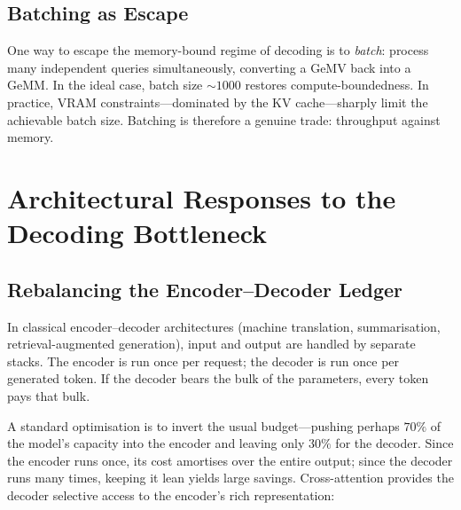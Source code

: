 \documentclass[11pt,a4paper]{article}
\theoremstyle{definition}
\theoremstyle{remark}
\theoremstyle{plain}
\begin{document}
\subsection{Batching as Escape}

One way to escape the memory-bound regime of decoding is to \emph{batch}:
process many independent queries simultaneously, converting a GeMV back
into a GeMM. In the ideal case, batch size $\sim 1000$ restores
compute-boundedness. In practice, VRAM constraints---dominated by the KV
cache---sharply limit the achievable batch size. Batching is therefore a
genuine trade: throughput against memory.

\section{Architectural Responses to the Decoding Bottleneck}
\label{sec:arch}

\subsection{Rebalancing the Encoder--Decoder Ledger}

In classical encoder--decoder architectures (machine translation,
summarisation, retrieval-augmented generation), input and output are
handled by separate stacks. The encoder is run once per request; the
decoder is run once per generated token. If the decoder bears the bulk of
the parameters, every token pays that bulk.

A standard optimisation is to invert the usual budget---pushing perhaps
$70\%$ of the model's capacity into the encoder and leaving only $30\%$
for the decoder. Since the encoder runs once, its cost amortises over the
entire output; since the decoder runs many times, keeping it lean yields
large savings. Cross-attention provides the decoder selective access to
the encoder's rich representation:

\begin{center}
\end{center}
\end{document}
